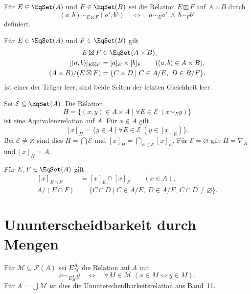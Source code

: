 \begin{definition}
Für $E\in\EqSet(A)$ und $F\in\EqSet(B)$ sei die Relation
$E\boxtimes F$ auf $A\times B$ durch
\[
 (a,b)\sim_{E\boxtimes F}(a',b')
 \quad\Longleftrightarrow\quad
 a\sim_E a'\ \land\ b\sim_F b'
\]
definiert.
\end{definition}

\begin{theorem}[Produktklassen]
\label{b11guide:thm:product}
Für $E\in\EqSet(A)$ und $F\in\EqSet(B)$ gilt
\[
\begin{aligned}
 E\boxtimes F&\in\EqSet(A\times B),\\
 [(a,b)]_{E\boxtimes F}&=[a]_E\times[b]_F
                       \qquad((a,b)\in A\times B),\\
 (A\times B)/(E\boxtimes F)
     &=\{C\times D\mid C\in A/E,\ D\in B/F\}.
\end{aligned}
\]
Ist einer der Träger leer, sind beide Seiten der letzten
Gleichheit leer.
\end{theorem}

\begin{theorem}
\label{b11guide:thm:intersection}
Sei $\mathcal E\subseteq\EqSet(A)$. Die Relation
\[
 H=\{(x,y)\in A\times A\mid
                   \forall E\in\mathcal E\;(x\sim_E y)\}
\]
ist eine Äquivalenzrelation auf $A$. Für $x\in A$ gilt
\[
 [x]_H=\{y\in A\mid\forall E\in\mathcal E\;(y\in[x]_E)\}.
\]
Bei $\mathcal E\ne\varnothing$ sind dies
$H=\bigcap\mathcal E$ und $[x]_H=\bigcap_{E\in\mathcal E}[x]_E$.
Für $\mathcal E=\varnothing$ gilt $H=\nabla_A$ und $[x]_H=A$.
\end{theorem}

\begin{theorem}
Für $E,F\in\EqSet(A)$ gilt
\[
\begin{aligned}
 [x]_{E\cap F}&=[x]_E\cap[x]_F\qquad(x\in A),\\
 A/(E\cap F)&=\{C\cap D\mid C\in A/E,\ D\in A/F,\
                                      C\cap D\ne\varnothing\}.
\end{aligned}
\]
\end{theorem}

\section{Ununterscheidbarkeit durch Mengen}

\begin{definition}[Ununterscheidbarkeitsrelation]
\label{b11guide:def:indiscernibility}
Für $\mathcal M\subseteq\mathcal P(A)$ sei $E_{\mathcal M}^A$
die Relation auf $A$ mit
\[
 x\sim_{E_{\mathcal M}^A}y
 \quad\Longleftrightarrow\quad
 \forall M\in\mathcal M\;(x\in M\Longleftrightarrow y\in M).
\]
Für $A=\bigcup\mathcal M$ ist dies die
Ununterscheidbarkeitsrelation aus Band~11.
\end{definition}

